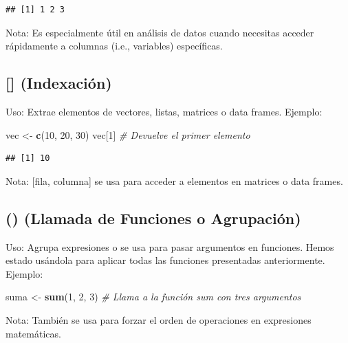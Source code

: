 \documentclass[
]{book}
\newenvironment{Shaded}{\begin{snugshade}}{\end{snugshade}}
\newcommand{\CommentTok}[1]{\textcolor[rgb]{0.56,0.35,0.01}{\textit{#1}}}
\newcommand{\DecValTok}[1]{\textcolor[rgb]{0.00,0.00,0.81}{#1}}
\newcommand{\FunctionTok}[1]{\textcolor[rgb]{0.13,0.29,0.53}{\textbf{#1}}}
\newcommand{\NormalTok}[1]{#1}
\newcommand{\OtherTok}[1]{\textcolor[rgb]{0.56,0.35,0.01}{#1}}
\begin{document}
\begin{verbatim}
## [1] 1 2 3
\end{verbatim}

Nota: Es especialmente útil en análisis de datos cuando necesitas acceder rápidamente a columnas (i.e., variables) específicas.

\hypertarget{indexaciuxf3n}{%
\subsection{{[}{]} (Indexación)}\label{indexaciuxf3n}}

Uso: Extrae elementos de vectores, listas, matrices o data frames.
Ejemplo:

\begin{Shaded}
\begin{Highlighting}[]
\NormalTok{vec }\OtherTok{\textless{}{-}} \FunctionTok{c}\NormalTok{(}\DecValTok{10}\NormalTok{, }\DecValTok{20}\NormalTok{, }\DecValTok{30}\NormalTok{)}
\NormalTok{vec[}\DecValTok{1}\NormalTok{]  }\CommentTok{\# Devuelve el primer elemento}
\end{Highlighting}
\end{Shaded}

\begin{verbatim}
## [1] 10
\end{verbatim}

Nota: {[}fila, columna{]} se usa para acceder a elementos en matrices o data frames.

\hypertarget{llamada}{%
\subsection{() (Llamada de Funciones o Agrupación)}\label{llamada}}

Uso: Agrupa expresiones o se usa para pasar argumentos en funciones. Hemos estado usándola para aplicar todas las funciones presentadas anteriormente.
Ejemplo:

\begin{Shaded}
\begin{Highlighting}[]
\NormalTok{suma }\OtherTok{\textless{}{-}} \FunctionTok{sum}\NormalTok{(}\DecValTok{1}\NormalTok{, }\DecValTok{2}\NormalTok{, }\DecValTok{3}\NormalTok{)  }\CommentTok{\# Llama a la función sum con tres argumentos}
\end{Highlighting}
\end{Shaded}

Nota: También se usa para forzar el orden de operaciones en expresiones matemáticas.
\end{document}
